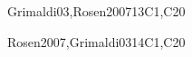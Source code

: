 \begin{syllabus}
\begin{unit}{\DSSetsRelationsandFunctions}{}{Grimaldi03,Rosen2007}{13}{C1,C20}
   \begin{topics}
        \item \DSSetsRelationsandFunctionsTopicSets
        \item \DSSetsRelationsandFunctionsTopicRelations
        \item \DSSetsRelationsandFunctionsTopicFunctions
   \end{topics}
   \begin{learningoutcomes}
	\item \DSSetsRelationsandFunctionsLOExplainWith [\Assessment]
	\item \DSSetsRelationsandFunctionsLOPerformThe [\Assessment]
	\item \DSSetsRelationsandFunctionsLORelate [\Assessment]
   \end{learningoutcomes}
 \end{unit}

 \begin{unit}{\DSBasicLogic}{}{Rosen2007,Grimaldi03}{14}{C1,C20}
   \begin{topics}
        \item \DSBasicLogicTopicPropositional%
        \item \DSBasicLogicTopicLogical%
        \item \DSBasicLogicTopicTruth%
        \item \DSBasicLogicTopicNormal%
        \item \DSBasicLogicTopicValidity%
        \item \DSBasicLogicTopicPropositionalInference%
        \item \DSBasicLogicTopicPredicate%
        \item \DSBasicLogicTopicLimitations%
   \end{topics}
   \begin{learningoutcomes}
	\item \DSBasicLogicLOConvertLogical [\Usage ]
	\item \DSBasicLogicLOApplyFormal [\Usage ]
	\item \DSBasicLogicLOUseThe [\Usage]
	\item \DSBasicLogicLODescribeHowCan [\Familiarity]
	\item \DSBasicLogicLOApplyFormalAnd [\Usage ]
	\item \DSBasicLogicLODescribeTheLimitationsAnd [\Usage]
   \end{learningoutcomes}
 \end{unit}


\end{syllabus}
